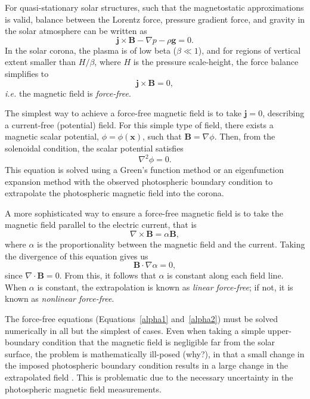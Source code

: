 \documentclass[12pt]{../style-files/ociamthesis}
\begin{document}
For quasi-stationary solar structures, such that the magnetostatic approximations is valid, balance between the Lorentz force, pressure gradient force, and gravity in the solar atmosphere can be written as
\begin{equation}
\mathbf{j} \times \mathbf{B} - \nabla p - \rho \mathbf{g} = 0.
\end{equation}
In the solar corona, the plasma is of low beta ($\beta \ll 1$), and for regions of vertical extent smaller than $H/\beta$, where $H$ is the pressure scale-height, the force balance simplifies to 
\begin{equation}
\mathbf{j} \times \mathbf{B} = 0,
\end{equation}
\textit{i.e.} the magnetic field is \textit{force-free}.

The simplest way to achieve a force-free magnetic field is to take $\mathbf{j} = 0$, describing a current-free (potential) field. For this simple type of field, there exists a magnetic scalar potential, $\phi = \phi(\mathbf{x})$, such that $\mathbf{B} = \nabla\phi$. Then, from the solenoidal condition, the scalar potential satisfies
\begin{equation}
\nabla^2 \phi = 0.
\end{equation}
This equation is solved using a Green's function method or an eigenfunction expansion method with the observed photospheric boundary condition to extrapolate the photospheric magnetic field into the corona.

A more sophisticated way to ensure a force-free magnetic field is to take the magnetic field parallel to the electric current, that is
\begin{equation}
\nabla \times \mathbf{B} = \alpha \mathbf{B},
\label{alpha1}
\end{equation}
where $\alpha$ is the proportionality between the magnetic field and the current. Taking the divergence of this equation gives us
\begin{equation}
\mathbf{B} \cdot \nabla\alpha = 0,
\label{alpha2}
\end{equation}
since $\nabla \cdot \mathbf{B} = 0$. From this, it follows that $\alpha$ is constant along each field line. When $\alpha$ is constant, the extrapolation is known as \textit{linear force-free}; if not, it is known as \textit{nonlinear force-free}.

The force-free equations (Equations~\eqref{alpha1} and~\eqref{alpha2}) must be solved numerically in all but the simplest of cases. Even when taking a simple upper-boundary condition that the magnetic field is negligible far from the solar surface, the problem is mathematically ill-posed (why?), in that a small change in the imposed photospheric boundary condition results in a large change in the extrapolated field \citep{low_etal90}. This is problematic due to the necessary uncertainty in the photospheric magnetic field measurements.
\end{document}
